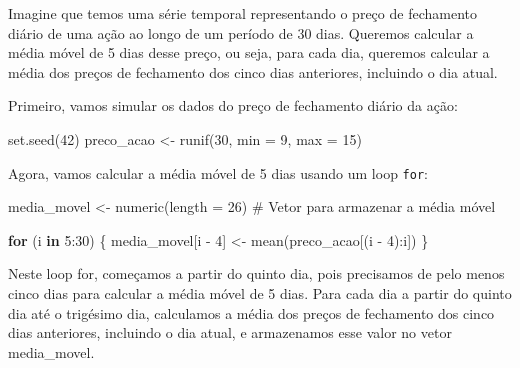 \documentclass[
  portuguese,
  letterpaper,
  DIV=11,
  numbers=noendperiod]{scrreprt}
\newenvironment{Shaded}{\begin{snugshade}}{\end{snugshade}}
\newcommand{\AttributeTok}[1]{\textcolor[rgb]{0.40,0.45,0.13}{#1}}
\newcommand{\CommentTok}[1]{\textcolor[rgb]{0.37,0.37,0.37}{#1}}
\newcommand{\ControlFlowTok}[1]{\textcolor[rgb]{0.00,0.23,0.31}{\textbf{#1}}}
\newcommand{\DecValTok}[1]{\textcolor[rgb]{0.68,0.00,0.00}{#1}}
\newcommand{\FunctionTok}[1]{\textcolor[rgb]{0.28,0.35,0.67}{#1}}
\newcommand{\NormalTok}[1]{\textcolor[rgb]{0.00,0.23,0.31}{#1}}
\newcommand{\OtherTok}[1]{\textcolor[rgb]{0.00,0.23,0.31}{#1}}
\newcommand{\SpecialCharTok}[1]{\textcolor[rgb]{0.37,0.37,0.37}{#1}}
\theoremstyle{definition}
\theoremstyle{remark}
\begin{document}
\begin{tcolorbox}[enhanced jigsaw, leftrule=.75mm, opacitybacktitle=0.6, colback=white, coltitle=black, colframe=quarto-callout-tip-color-frame, titlerule=0mm, left=2mm, opacityback=0, breakable, bottomtitle=1mm, toprule=.15mm, title=\textcolor{quarto-callout-tip-color}{\faLightbulb}\hspace{0.5em}{Clique e veja um exemplo extra}, colbacktitle=quarto-callout-tip-color!10!white, arc=.35mm, rightrule=.15mm, bottomrule=.15mm, toptitle=1mm]

Imagine que temos uma série temporal representando o preço de fechamento
diário de uma ação ao longo de um período de 30 dias. Queremos calcular
a média móvel de 5 dias desse preço, ou seja, para cada dia, queremos
calcular a média dos preços de fechamento dos cinco dias anteriores,
incluindo o dia atual.

Primeiro, vamos simular os dados do preço de fechamento diário da ação:

\begin{Shaded}
\begin{Highlighting}[]
\FunctionTok{set.seed}\NormalTok{(}\DecValTok{42}\NormalTok{)}
\NormalTok{preco\_acao }\OtherTok{\textless{}{-}} \FunctionTok{runif}\NormalTok{(}\DecValTok{30}\NormalTok{, }\AttributeTok{min =} \DecValTok{9}\NormalTok{, }\AttributeTok{max =} \DecValTok{15}\NormalTok{)}
\end{Highlighting}
\end{Shaded}

Agora, vamos calcular a média móvel de 5 dias usando um loop
\texttt{for}:

\begin{Shaded}
\begin{Highlighting}[]
\NormalTok{media\_movel }\OtherTok{\textless{}{-}} \FunctionTok{numeric}\NormalTok{(}\AttributeTok{length =} \DecValTok{26}\NormalTok{)  }\CommentTok{\# Vetor para armazenar a média móvel}

\ControlFlowTok{for}\NormalTok{ (i }\ControlFlowTok{in} \DecValTok{5}\SpecialCharTok{:}\DecValTok{30}\NormalTok{) \{}
\NormalTok{  media\_movel[i }\SpecialCharTok{{-}} \DecValTok{4}\NormalTok{] }\OtherTok{\textless{}{-}} \FunctionTok{mean}\NormalTok{(preco\_acao[(i }\SpecialCharTok{{-}} \DecValTok{4}\NormalTok{)}\SpecialCharTok{:}\NormalTok{i])}
\NormalTok{\}}
\end{Highlighting}
\end{Shaded}

Neste loop for, começamos a partir do quinto dia, pois precisamos de
pelo menos cinco dias para calcular a média móvel de 5 dias. Para cada
dia a partir do quinto dia até o trigésimo dia, calculamos a média dos
preços de fechamento dos cinco dias anteriores, incluindo o dia atual, e
armazenamos esse valor no vetor media\_movel.


\end{tcolorbox}
\end{document}
